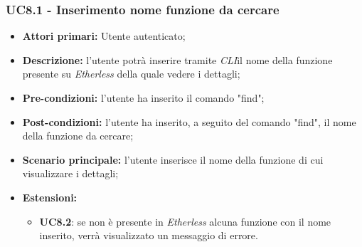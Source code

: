\subsubsection{UC8.1 - Inserimento nome funzione da cercare}
\begin{itemize}
	\item \textbf{Attori primari:} Utente autenticato;
	\item \textbf{Descrizione:} l'utente potrà inserire tramite \textit{CLI\glos}il nome della funzione presente su \textit{Etherless} della quale vedere i dettagli; 
	\item \textbf{Pre-condizioni:} l'utente ha inserito il comando "find";
	\item \textbf{Post-condizioni:} l'utente ha inserito, a seguito del comando "find", il nome della funzione da cercare;
	\item \textbf{Scenario principale:} l'utente inserisce il nome della funzione di cui visualizzare i dettagli;
	\item \textbf{Estensioni:} 
	\begin{itemize}
		\item \textbf{UC8.2}: se non è presente in \textit{Etherless} alcuna funzione con il nome inserito, verrà visualizzato un messaggio di errore.
	\end{itemize}
\end{itemize}